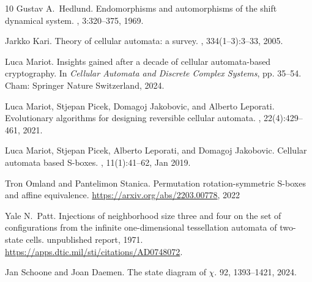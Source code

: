 \documentclass[11pt,english,a4paper]{amsart}
\theoremstyle{plain}
\theoremstyle{definition}
\theoremstyle{remark}
\begin{document}
\begin{thebibliography}{10}
		Gustav A.\ Hedlund.
		\newblock Endomorphisms and automorphisms of the shift dynamical system.
		, 3:320--375, 1969.


		Jarkko Kari.
		\newblock Theory of cellular automata: a survey.
		, 334(1--3):3--33, 2005.

		Luca Mariot.
		\newblock Insights gained after a decade of cellular automata-based
		cryptography.
		\newblock In {\em Cellular Automata and Discrete Complex Systems}, pp. 35–54. Cham: Springer Nature Switzerland, 2024.
        
  
		Luca Mariot, Stjepan Picek, Domagoj Jakobovic, and Alberto Leporati.
		\newblock Evolutionary algorithms for designing reversible cellular automata.
		, 22(4):429--461, 2021.
		
		Luca Mariot, Stjepan Picek, Alberto Leporati, and Domagoj Jakobovic.
		\newblock Cellular automata based {S}-boxes.
		, 11(1):41--62, Jan 2019.
		
		Tron Omland and Pantelimon Stanica.
		\newblock Permutation rotation-symmetric {S}-boxes and affine equivalence.
		\newblock \url{https://arxiv.org/abs/2203.00778}, 2022

		Yale N.\ Patt.
		\newblock Injections of neighborhood size three and four on the set of configurations from the infinite one-dimensional tessellation automata of two-state cells.
		\newblock unpublished report, 1971. %
		\newblock \url{https://apps.dtic.mil/sti/citations/AD0748072}.
  
		Jan Schoone and Joan Daemen.
		\newblock The state diagram of $\chi$.
		 92, 1393--1421, 2024.
		
	\end{thebibliography}
	
\end{document}
